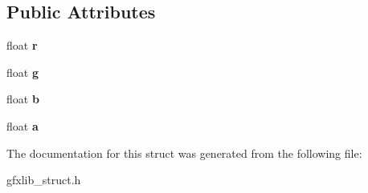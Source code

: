 \subsection*{Public Attributes}
\begin{DoxyCompactItemize}
\item 
float {\bfseries r}\hypertarget{structGFXColor_a2ce7ff32c12e5a143028f1096ae16044}{}\label{structGFXColor_a2ce7ff32c12e5a143028f1096ae16044}

\item 
float {\bfseries g}\hypertarget{structGFXColor_a853b235ca9edc19c88ac1e64e53127fd}{}\label{structGFXColor_a853b235ca9edc19c88ac1e64e53127fd}

\item 
float {\bfseries b}\hypertarget{structGFXColor_a2496775fa3b3ebce5b9a3d728b9d291a}{}\label{structGFXColor_a2496775fa3b3ebce5b9a3d728b9d291a}

\item 
float {\bfseries a}\hypertarget{structGFXColor_aea4f85993ae9080a13ff0644cef85f1f}{}\label{structGFXColor_aea4f85993ae9080a13ff0644cef85f1f}

\end{DoxyCompactItemize}


The documentation for this struct was generated from the following file\+:\begin{DoxyCompactItemize}
\item 
gfxlib\+\_\+struct.\+h\end{DoxyCompactItemize}
